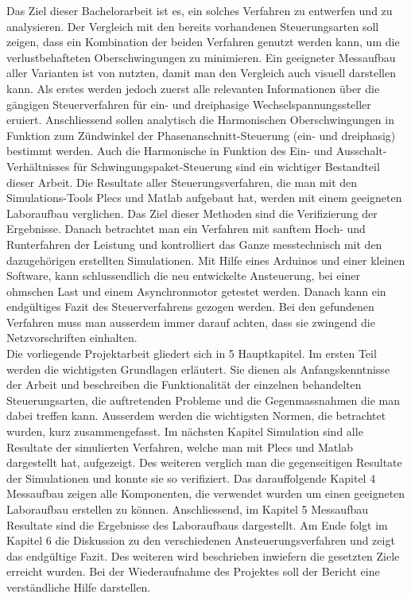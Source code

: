Das Ziel dieser Bachelorarbeit ist es, ein solches Verfahren zu entwerfen und zu analysieren. Der Vergleich mit den bereits vorhandenen Steuerungsarten soll zeigen, dass ein Kombination der beiden Verfahren genutzt werden kann, um die verlustbehafteten Oberschwingungen zu minimieren. Ein geeigneter Messaufbau aller Varianten ist von nutzten, damit man den Vergleich auch visuell darstellen kann. Als erstes werden jedoch zuerst alle relevanten Informationen über die gängigen Steuerverfahren für ein- und dreiphasige Wechselspannungssteller eruiert. Anschliessend sollen analytisch die Harmonischen Oberschwingungen in Funktion zum Zündwinkel der Phasenanschnitt-Steuerung (ein- und dreiphasig) bestimmt werden. Auch die Harmonische in Funktion des Ein- und Ausschalt-Verhältnisses für Schwingungspaket-Steuerung sind ein wichtiger Bestandteil dieser Arbeit. Die Resultate aller Steuerungsverfahren, die man mit den Simulations-Tools Plecs und Matlab aufgebaut hat, werden mit einem geeigneten Laboraufbau verglichen. Das Ziel dieser Methoden sind die Verifizierung der Ergebnisse. Danach betrachtet man ein Verfahren mit sanftem Hoch- und Runterfahren der Leistung und kontrolliert das Ganze messtechnisch mit den dazugehörigen erstellten Simulationen. Mit Hilfe eines Arduinos und einer kleinen Software, kann schlussendlich die neu entwickelte Ansteuerung, bei einer ohmschen Last und einem Asynchronmotor getestet werden. Danach kann ein endgültiges Fazit des Steuerverfahrens gezogen werden. Bei den gefundenen Verfahren muss man ausserdem immer darauf achten, dass sie zwingend die Netzvorschriften einhalten.\\
Die vorliegende Projektarbeit gliedert sich in 5 Hauptkapitel. Im ersten Teil werden die wichtigsten Grundlagen erläutert. Sie dienen als Anfangskenntnisse der Arbeit und beschreiben die Funktionalität der einzelnen behandelten Steuerungsarten, die auftretenden Probleme und die Gegenmassnahmen die man dabei treffen kann. Ausserdem werden die wichtigsten Normen, die betrachtet wurden, kurz zusammengefasst. Im nächsten Kapitel Simulation sind alle Resultate der simulierten Verfahren, welche man mit Plecs und Matlab dargestellt hat, aufgezeigt. Des weiteren verglich man die gegenseitigen Resultate der Simulationen und konnte sie so verifiziert. Das darauffolgende Kapitel 4 Messaufbau zeigen alle Komponenten, die verwendet wurden um einen geeigneten Laboraufbau erstellen zu können. Anschliessend, im Kapitel 5 Messaufbau Resultate sind die Ergebnisse des Laboraufbaus dargestellt. Am Ende folgt im Kapitel 6 die Diskussion zu den verschiedenen Ansteuerungsverfahren und zeigt das endgültige Fazit. Des weiteren wird beschrieben inwiefern die gesetzten Ziele erreicht wurden. Bei der Wiederaufnahme des Projektes soll der Bericht eine verständliche Hilfe darstellen.





















